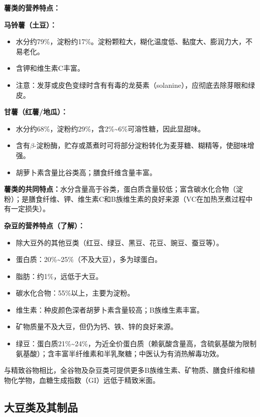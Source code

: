\begin{defbox}
\textbf{薯类的营养特点：}

\textbf{马铃薯（土豆）：}
\begin{itemize}[leftmargin=*]
    \item 水分约79\%，淀粉约17\%。淀粉颗粒大，糊化温度低、黏度大、膨润力大，不易老化。
    \item 含钾和维生素C丰富。
    \item 注意：发芽或皮色变绿时含有有毒的龙葵素（solanine），应彻底去除芽眼和绿皮。
\end{itemize}

\textbf{甘薯（红薯/地瓜）：}
\begin{itemize}[leftmargin=*]
    \item 水分约68\%，淀粉约29\%，含2\%\~{}6\%可溶性糖，因此显甜味。
    \item 含有$\beta$-淀粉酶，贮存或蒸煮时可将部分淀粉转化为麦芽糖、糊精等，使甜味增强。
    \item 胡萝卜素含量比谷类高；膳食纤维含量丰富。
\end{itemize}

\textbf{薯类的共同特点：}水分含量高于谷类，蛋白质含量较低；富含碳水化合物（淀粉）；是膳食纤维、钾、维生素C和B族维生素的良好来源（VC在加热烹煮过程中有一定损失）。

\textbf{杂豆的营养特点（了解）：}
\begin{itemize}[leftmargin=*]
    \item 除大豆外的其他豆类（红豆、绿豆、黑豆、花豆、豌豆、蚕豆等）。
    \item 蛋白质：20\%\~{}25\%（不及大豆），多为球蛋白。
    \item 脂肪：约1\%，远低于大豆。
    \item 碳水化合物：55\%以上，主要为淀粉。
    \item 维生素：种皮颜色深者胡萝卜素含量较高；B族维生素丰富。
    \item 矿物质量不及大豆，但仍为钙、铁、锌的良好来源。
    \item 绿豆：蛋白质21\%\~{}24\%，为近全价蛋白质（赖氨酸含量高，含硫氨基酸为限制氨基酸）；含丰富半纤维素和半乳聚糖；中医认为有消热解毒功效。
\end{itemize}

与精致谷物相比，全谷物及杂豆类可提供更多B族维生素、矿物质、膳食纤维和植物化学物，血糖生成指数（GI）远低于精致米面。
\end{defbox}

\subsection{大豆类及其制品}

